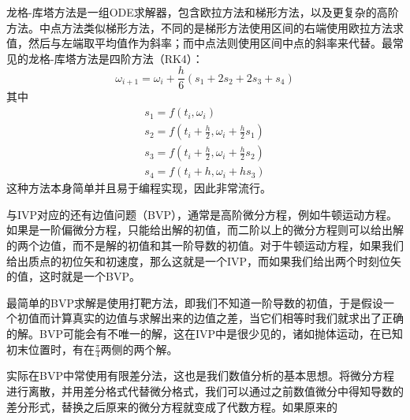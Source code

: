 \documentclass[UTF8,a4paper,10pt]{ctexart}
\begin{document}
\begin{multicols}{2}
            龙格-库塔方法是一组ODE求解器，包含欧拉方法和梯形方法，以及更复杂的高阶方法。中点方法类似梯形方法，不同的是梯形方法使用区间的右端使用欧拉方法求值，然后与左端取平均值作为斜率；而中点法则使用区间中点的斜率来代替。最常见的龙格-库塔方法是四阶方法（RK4）：
            \begin{equation}
                \omega_{i+1} = \omega_i + \frac{h}{6}(s_1+2s_2+2s_3+s_4)
            \end{equation}
            其中
            \begin{equation*}
                \begin{array}{l}
                    s_1 = f(t_i,\omega_i)\\
                    s_2 = f(t_i+\frac{h}{2},\omega_i+\frac{h}{2}s_1)\\
                    s_3 = f(t_i+\frac{h}{2},\omega_i+\frac{h}{2}s_2)\\
                    s_4 = f(t_i+h,\omega_i+hs_3)
                \end{array}
            \end{equation*}
            这种方法本身简单并且易于编程实现，因此非常流行。\par
            与IVP对应的还有边值问题（BVP），通常是高阶微分方程，例如牛顿运动方程。如果是一阶偏微分方程，只能给出解的初值，而二阶以上的微分方程则可以给出解的两个边值，而不是解的初值和其一阶导数的初值。对于牛顿运动方程，如果我们给出质点的初位矢和初速度，那么这就是一个IVP，而如果我们给出两个时刻位矢的值，这时就是一个BVP。\par
            最简单的BVP求解是使用打靶方法，即我们不知道一阶导数的初值，于是假设一个初值而计算真实的边值与求解出来的边值之差，当它们相等时我们就求出了正确的解。BVP可能会有不唯一的解，这在IVP中是很少见的，诸如抛体运动，在已知初末位置时，有在$\frac{\pi}{4}$两侧的两个解。\par
            实际在BVP中常使用有限差分法，这也是我们数值分析的基本思想。将微分方程进行离散，并用差分格式代替微分格式，我们可以通过之前数值微分中得知导数的差分形式，替换之后原来的微分方程就变成了代数方程。如果原来的

\end{multicols}
\end{document}
